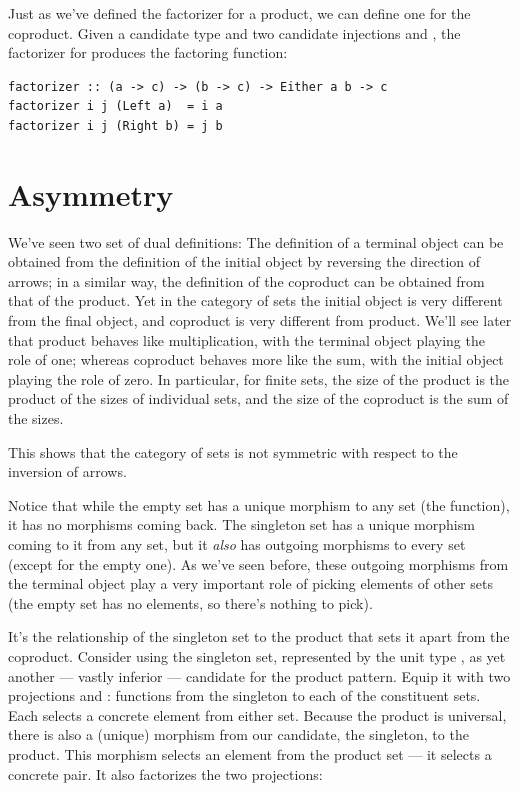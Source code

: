 Just as we've defined the factorizer for a product, we can define one
for the coproduct. Given a candidate type  and two candidate
injections  and , the factorizer for 
produces the factoring function:

\begin{verbatim}
factorizer :: (a -> c) -> (b -> c) -> Either a b -> c
factorizer i j (Left a)  = i a
factorizer i j (Right b) = j b
\end{verbatim}

\section{Asymmetry}\label{asymmetry}

We've seen two set of dual definitions: The definition of a terminal
object can be obtained from the definition of the initial object by
reversing the direction of arrows; in a similar way, the definition of
the coproduct can be obtained from that of the product. Yet in the
category of sets the initial object is very different from the final
object, and coproduct is very different from product. We'll see later
that product behaves like multiplication, with the terminal object
playing the role of one; whereas coproduct behaves more like the sum,
with the initial object playing the role of zero. In particular, for
finite sets, the size of the product is the product of the sizes of
individual sets, and the size of the coproduct is the sum of the sizes.

This shows that the category of sets is not symmetric with respect to
the inversion of arrows.

Notice that while the empty set has a unique morphism to any set (the
 function), it has no morphisms coming back. The
singleton set has a unique morphism coming to it from any set, but it
\emph{also} has outgoing morphisms to every set (except for the empty
one). As we've seen before, these outgoing morphisms from the terminal
object play a very important role of picking elements of other sets (the
empty set has no elements, so there's nothing to pick).

It's the relationship of the singleton set to the product that sets it
apart from the coproduct. Consider using the singleton set, represented
by the unit type \code{()}, as yet another --- vastly inferior ---
candidate for the product pattern. Equip it with two projections
 and : functions from the singleton to each of the
constituent sets. Each selects a concrete element from either set.
Because the product is universal, there is also a (unique) morphism
 from our candidate, the singleton, to the product. This
morphism selects an element from the product set --- it selects a
concrete pair. It also factorizes the two projections:

